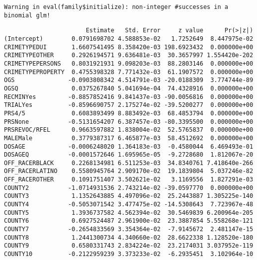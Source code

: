 \documentclass[
  letterpaper,
  DIV=11,
  numbers=noendperiod]{scrartcl}
\newenvironment{Shaded}{\begin{snugshade}}{\end{snugshade}}
\newcommand{\FunctionTok}[1]{\textcolor[rgb]{0.28,0.35,0.67}{#1}}
\newcommand{\NormalTok}[1]{\textcolor[rgb]{0.00,0.23,0.31}{#1}}
\newcommand{\SpecialCharTok}[1]{\textcolor[rgb]{0.37,0.37,0.37}{#1}}
\begin{document}
\begin{verbatim}
Warning in eval(family$initialize): non-integer #successes in a binomial glm!
\end{verbatim}

\begin{Shaded}
\end{Shaded}

\begin{verbatim}
                       Estimate   Std. Error     z value      Pr(>|z|)
(Intercept)        0.0791698702 4.588853e-02   1.7252649  8.447975e-02
CRIMETYPEDUI       1.6607541495 8.358420e-03 198.6923432  0.000000e+00
CRIMETYPEOTHER     0.2926194571 9.636481e-03  30.3657997 1.554420e-202
CRIMETYPEPERSONS   0.8031921931 9.098203e-03  88.2803146  0.000000e+00
CRIMETYPEPROPERTY  0.4755398328 7.771432e-03  61.1907572  0.000000e+00
OGS               -0.0903808342 4.514791e-03 -20.0188309  3.774744e-89
OGSQ               0.0375267840 5.041694e-04  74.4328916  0.000000e+00
RECMINYes         -0.8857852416 9.841437e-03 -90.0056816  0.000000e+00
TRIALYes          -0.8596690757 2.175274e-02 -39.5200277  0.000000e+00
PRS4/5             0.6083893499 8.883492e-03  68.4853794  0.000000e+00
PRSNone           -0.5131654207 6.387457e-03 -80.3395500  0.000000e+00
PRSREVOC/RFEL      0.9663597882 1.838004e-02  52.5765837  0.000000e+00
MALEMale           0.3779387317 6.465877e-03  58.4512692  0.000000e+00
DOSAGE            -0.0006248020 1.364183e-03  -0.4580044  6.469493e-01
DOSAGEQ           -0.0001572646 1.695965e-05  -9.2728680  1.812067e-20
OFF_RACERBLACK     0.2268134981 6.511253e-03  34.8340761 7.418640e-266
OFF_RACERLATINO    0.5580945764 2.909170e-02  19.1839804  5.037246e-82
OFF_RACEROTHER     0.1091751407 3.502621e-02   3.1169556  1.827291e-03
COUNTY2           -1.0714931536 2.743214e-02 -39.0597770  0.000000e+00
COUNTY3            1.1352643885 4.497096e-02  25.2443887 1.305225e-140
COUNTY4           -0.5053071542 3.477475e-02 -14.5308643  7.723967e-48
COUNTY5            1.3936737582 4.562394e-02  30.5469839 6.200964e-205
COUNTY6            0.6927524487 2.961900e-02  23.3887854 5.558268e-121
COUNTY7           -0.2654833569 3.354364e-02  -7.9145672  2.481147e-15
COUNTY8            1.2441300734 4.340660e-02  28.6622338 1.128520e-180
COUNTY9            0.6580331743 2.834224e-02  23.2174031 3.037952e-119
COUNTY10          -0.2122959239 3.373233e-02  -6.2935451  3.102964e-10

\end{verbatim}
\end{document}
